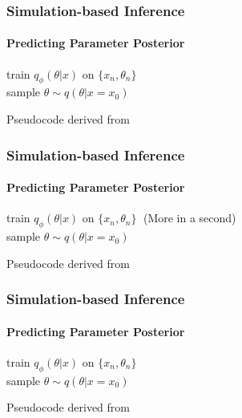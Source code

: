 \documentclass[9pt]{beamer}
\begin{document}
\begin{frame}
\frametitle{Simulation-based Inference}
\framesubtitle{Predicting Parameter Posterior}
\begin{algorithm}[H]
	\color{orange}
	\color{black}train $q_{\phi}(\theta| x)$ on $\lbrace x_n,\theta_n \rbrace$\\
	sample $\theta \sim q(\theta | x=x_0)$
\end{algorithm}
\vspace{35pt}
\tiny Pseudocode derived from \cite{papamakarios2016fast}
\end{frame}
\begin{frame}
\frametitle{Simulation-based Inference}
\framesubtitle{Predicting Parameter Posterior}
\begin{algorithm}[H]
	\color{orange}train $q_{\phi}(\theta| x)$ on $\lbrace x_n,\theta_n \rbrace\;$\color{black} (More in a second)\\
	sample $\theta \sim q(\theta | x=x_0)$
\end{algorithm}
\vspace{35pt}
\tiny Pseudocode derived from \cite{papamakarios2016fast}
\end{frame} 
\begin{frame}
\frametitle{Simulation-based Inference}
\framesubtitle{Predicting Parameter Posterior}
\begin{algorithm}[H]
	\color{black}train $q_{\phi}(\theta| x)$ on $\lbrace x_n,\theta_n \rbrace$\\
\color{orange}	sample $\theta \sim q(\theta | x=x_0)$
\end{algorithm}
\vspace{35pt}
\tiny Pseudocode derived from \cite{papamakarios2016fast}
\end{frame} 
\end{document}
